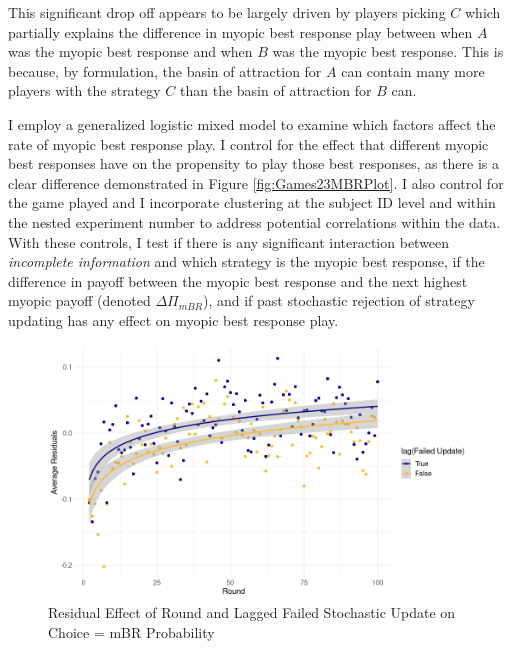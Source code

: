 This significant drop off appears to be largely driven by players picking $C$ which partially explains the difference in myopic best response play between when $A$ was the myopic best response and when $B$ was the myopic best response. This is because, by formulation, the basin of attraction for $A$ can contain many more players with the strategy $C$ than the basin of attraction for $B$ can.


I employ a generalized logistic mixed model to examine which factors affect the rate of myopic best response play. I control for the effect that different myopic best responses have on the propensity to play those best responses, as there is a clear difference demonstrated in Figure \ref{fig:Games23MBRPlot}. I also control for the game played and I incorporate clustering at the subject ID level and within the nested experiment number to address potential correlations within the data.
With these controls, I test if there is any significant interaction between \textit{incomplete information} and which strategy is the myopic best response, if the difference in payoff between the myopic best response and the next highest myopic payoff (denoted $\Delta\Pi_{mBR}$), and if past stochastic rejection of strategy updating has any effect on myopic best response play. 

\begin{figure}[h]
\captionsetup{justification=centering}
  \caption[caption]{Residual Effect of Round and Lagged Failed Stochastic Update on Choice = mBR Probability}
   \label{fig:Residual}
\vskip12pt
\includegraphics[width = \textwidth]{Images/ResidualPickMBR_round_lagChange.png}
\end{figure}

